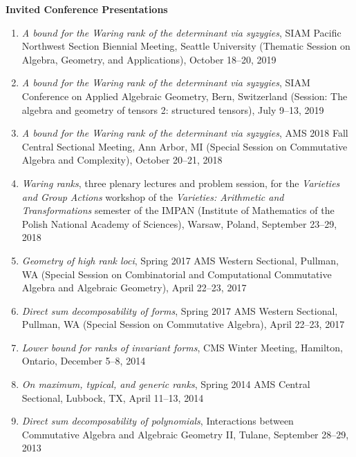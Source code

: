 \documentclass[12pt]{article}
\begin{document}
\textbf{Invited Conference Presentations}
\begin{enumerate}

\item \textit{A bound for the Waring rank of the determinant via syzygies},
SIAM Pacific Northwest Section Biennial Meeting, Seattle University
(Thematic Session on Algebra, Geometry, and Applications),
October 18--20, 2019

\item \textit{A bound for the Waring rank of the determinant via syzygies},
SIAM Conference on Applied Algebraic Geometry, Bern, Switzerland
(Session: The algebra and geometry of tensors 2: structured tensors),
July 9--13, 2019

\item \textit{A bound for the Waring rank of the determinant via syzygies},
AMS 2018 Fall Central Sectional Meeting, Ann Arbor, MI
(Special Session on Commutative Algebra and Complexity),
October 20--21, 2018

\item \textit{Waring ranks},
three plenary lectures and problem session,
for the \emph{Varieties and Group Actions} workshop of the \emph{Varieties: Arithmetic and Transformations}
semester of the IMPAN (Institute of Mathematics of the Polish National Academy of Sciences),
Warsaw, Poland, September 23--29, 2018

\item \textit{Geometry of high rank loci},
Spring 2017 AMS Western Sectional, Pullman, WA
(Special Session on Combinatorial and Computational Commutative Algebra and Algebraic Geometry),
April 22--23, 2017

\item \textit{Direct sum decomposability of forms},
Spring 2017 AMS Western Sectional, Pullman, WA
(Special Session on Commutative Algebra),
April 22--23, 2017

\item \textit{Lower bound for ranks of invariant forms},
CMS Winter Meeting, Hamilton, Ontario,
December 5--8, 2014

\item \textit{On maximum, typical, and generic ranks},
Spring 2014 AMS Central Sectional, Lubbock, TX,
April 11--13, 2014

\item \textit{Direct sum decomposability of polynomials},
Interactions between Commutative Algebra and Algebraic Geometry II,
Tulane,
September 28--29, 2013


\end{enumerate}
\end{document}
